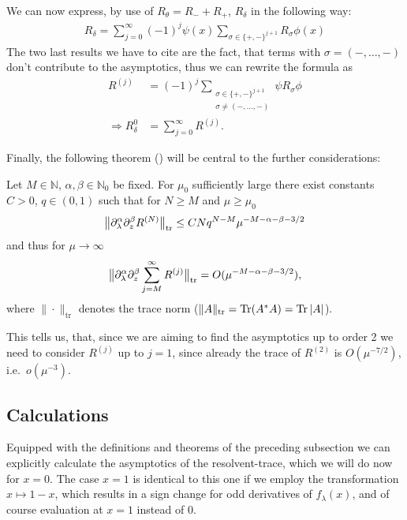 We can now express, by use of $R_\theta = R_- + R_+$, $R_\delta$ in the
following way:
\begin{align}
  R_\delta = \sum_{j=0}^\infty (-1)^j \psi(x) \sum_{\sigma\in\{+,-\}^{j+1}}
  R_\sigma \phi(x)
\end{align}
The two last results we have to cite are the fact, that terms with $\sigma =
(-,\ldots,-)$ don't contribute to the asymptotics, thus we can rewrite the
formula as
\begin{align}
  R^{(j)} &= (-1)^j \sum_{ \substack{ \sigma\in\{+,-\}^{j+1} \\
  \sigma\neq(-,\ldots,-) } } \psi R_\sigma \phi \\
  \Rightarrow R^0_\delta &= \sum_{j=0}^\infty R^{(j)}.
\end{align}

Finally, the following theorem (\cite[Prop 2.2]{LV13}) will be central to the
further considerations:
\begin{Theorem}
  \label{thm:r-expansion}
  Let $M\in\mathbb{N}$, $\alpha,\beta\in\mathbb{N}_0$ be fixed. For $\mu_0$
  sufficiently large there exist constants $C>0$, $q\in(0,1)$ such that for
  $N\geq M$ and $\mu \geq \mu_0$
  \begin{align}
    \Norm[\mathrm{tr}]{\partial_\lambda^\alpha\partial^\beta_z R^{(N)}}
    \leq CNq^{N-M}\mu^{-M-\alpha-\beta-3/2}
  \end{align}
  and thus for $\mu\to\infty$
  \begin{align}
    \Norm[\mathrm{tr}]{\partial^\alpha_\lambda\partial^\beta_z\sum_{j=M}^\infty
    R^{(j)}} = O(\mu^{-M-\alpha-\beta-3/2}),
  \end{align}
  where $\|\cdot\|_{\mathrm{tr}}$ denotes the trace norm
  ($\|A\|_\mathrm{tr} = \Tr(A^*A) = \Tr\Abs{A}$).
\end{Theorem}
This tells us, that, since we are aiming to find the asymptotics up to order 2
we need to consider $R^{(j)}$ up to $j=1$, since already the trace of $R^{(2)}$
is $O(\mu^{-7/2})$, i.e.\ $o(\mu^{-3})$.

\subsection{Calculations}
Equipped with the definitions and theorems of the preceding subsection we can
explicitly calculate the asymptotics of the resolvent-trace, which we will do
now for $x=0$. The case $x=1$ is identical to this one if we employ the
transformation $x\mapsto 1-x$, which results in a sign change for odd
derivatives of $f_\lambda(x)$, and of course evaluation at $x=1$ instead of $0$.

